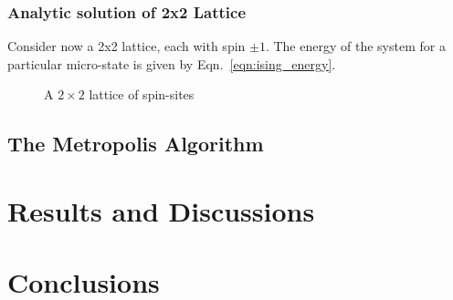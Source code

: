 \documentclass[10pt,showpacs,preprintnumbers,amsmath,amssymb,nofootinbib,aps,prl,twocolumn,groupedaddress,superscriptaddress,showkeys]{revtex4-1}
\begin{document}
  \subsubsection{Analytic solution of 2x2 Lattice}
    Consider now a 2x2 lattice, each with spin $\pm 1$.
    The energy of the system for a particular micro-state is given by Eqn.~\ref{eqn:ising_energy}.

     \begin{figure}[H]
      \centering
      \caption{A $2\times2$ lattice of spin-sites}
    \end{figure}

  \subsection{The Metropolis Algorithm}

\section{Results and Discussions}

\section{Conclusions}


\end{document}

